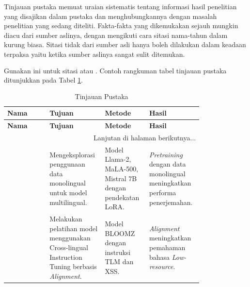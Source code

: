 Tinjauan pustaka memuat uraian sistematis tentang informasi hasil penelitian yang disajikan dalam pustaka dan menghubungkannya dengan masalah penelitian yang sedang diteliti. Fakta-fakta yang dikemukakan sejauh mungkin diacu dari sumber aslinya, dengan mengikuti cara sitasi nama-tahun dalam kurung biasa. Sitasi tidak dari sumber asli hanya boleh dilakukan dalam keadaan terpaksa yaitu ketika sumber aslinya sangat sulit ditemukan.

Gunakan ini untuk sitasi \citet{aji-etal-2022-one} atau \citep{aji-etal-2022-one}. Contoh rangkuman tabel tinjauan pustaka ditunjukkan pada Tabel \ref{tab:tinjauan-pustaka}.

\begin{longtable}{p{0.2\linewidth} p{0.2\linewidth} p{0.2\linewidth} p{0.2\linewidth}}
    \caption{Tinjauan Pustaka}
    \label{tab:tinjauan-pustaka} \\
    \hline
    \textbf{Nama} & \textbf{Tujuan} & \textbf{Metode} & \textbf{Hasil} \\
    \hline
    \endfirsthead

    \hline
    \textbf{Nama} & \textbf{Tujuan} & \textbf{Metode} & \textbf{Hasil} \\
    \hline
    \endhead

    \hline
    \multicolumn{4}{r}{Lanjutan di halaman berikutnya...} \\
    \endfoot

    \hline
    \endlastfoot

    \citet{iyer-etal-2024-exploring} &  
    Mengeksplorasi penggunaan data monolingual untuk model multilingual.  &  
    Model Llama-2, MaLA-500, Mistral 7B dengan pendekatan LoRA.& 
    \textit{Pretraining} dengan data monolingual meningkatkan performa penerjemahan. \\
    \hline 
    
    \citet{cahyawijaya-etal-2023-instructalign} &  
    Melakukan pelatihan model menggunakan Cross-lingual Instruction Tuning berbasis \textit{Alignment}.  &  
    Model BLOOMZ dengan instruksi TLM dan XSS. & 
    \textit{Alignment} meningkatkan pemahaman bahasa \textit{Low-resource}. \\
    \hline

\end{longtable}